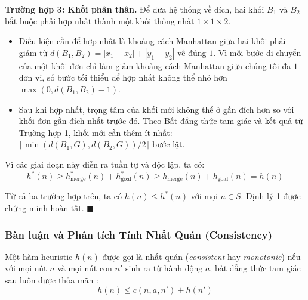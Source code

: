\noindent
\textbf{Trường hợp 3: Khối phân thân.}
Để đưa hệ thống về đích, hai khối $B_1$ và $B_2$ bắt buộc phải hợp nhất
thành một khối thống nhất $1 \times 1 \times 2$.
\begin{itemize}[--]
    \item Điều kiện cần để hợp nhất là khoảng cách Manhattan giữa hai khối
    phải giảm từ $d(B_1, B_2) = |x_1 - x_2| + |y_1 - y_2|$ về đúng $1$. Vì
    mỗi bước di chuyển của một khối đơn chỉ làm giảm khoảng cách Manhattan
    giữa chúng tối đa $1$ đơn vị, số bước tối thiểu để hợp nhất không thể
    nhỏ hơn $\max(0, d(B_1, B_2) - 1)$.
    \item Sau khi hợp nhất, trọng tâm của khối mới không thể ở gần đích hơn
    so với khối đơn gần đích nhất trước đó. Theo Bất đẳng thức tam giác và
    kết quả từ Trường hợp 1, khối mới cần thêm ít nhất:
    $\lceil \min(d(B_1, G), d(B_2, G)) / 2 \rceil$ bước lật.
\end{itemize}
Vì các giai đoạn này diễn ra tuần tự và độc lập, ta có:
\begin{equation}
    h^*(n) \ge h_{\text{merge}}^*(n) + h_{\text{goal}}^*(n) \ge
    h_{\text{merge}}(n) + h_{\text{goal}}(n) = h(n)
\end{equation}

Từ cả ba trường hợp trên, ta có $h(n) \le h^*(n)$ với mọi $n \in S$.
Định lý 1 được chứng minh hoàn tất. \hfill $\blacksquare$

\subsubsection{Bàn luận và Phân tích Tính Nhất Quán (Consistency)}
Một hàm heuristic $h(n)$ được gọi là nhất quán (\textit{consistent} hay \textit{monotonic}) nếu với mọi nút $n$
và mọi nút con $n'$ sinh ra từ hành động $a$, bất đẳng thức tam giác sau luôn được thỏa mãn \cite{russell2020aima}:
\begin{equation}
    h(n) \le c(n, a, n') + h(n')
    \label{eq:consistency_def}
\end{equation}

